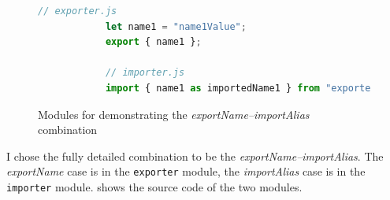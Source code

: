 \vspace*{-3mm}
\begin{figure}[!htb]
	\begin{lstlisting}[language=JavaScript]
			// exporter.js
			let name1 = "name1Value";
			export { name1 };

			// importer.js
			import { name1 as importedName1 } from "exporter";
	\end{lstlisting}
  \caption{Modules for demonstrating the \emph{exportName–importAlias} combination}
  \label{fig:export-import-example-source}
\end{figure}

I chose the fully detailed combination to be the \emph{exportName–importAlias}. The \emph{exportName} case is in the \lstinline{exporter} module, the \emph{importAlias} case is in the \lstinline{importer} module.  shows the source code of the two modules.

